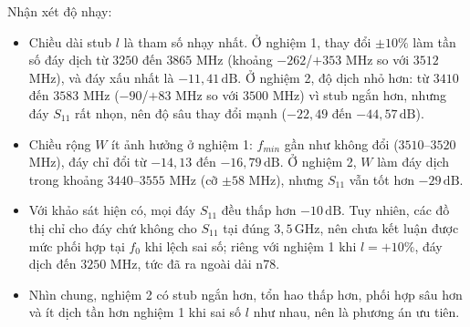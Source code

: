 \documentclass[a4paper]{report}
\newcommand\dB{\,\mathrm{dB}}
\newcommand\GHz{\,\mathrm{GHz}}
\begin{document}
\begin{table}[H]
\caption{Đáy $S_{11}$ và tần số đáy khi quét tham số Single-Stub}\label{tab:stubtolres}
\centering\footnotesize\setlength\tabcolsep{3pt}
\end{table}

Nhận xét độ nhạy:
\begin{itemize}
  \item Chiều dài stub $l$ là tham số nhạy nhất. Ở nghiệm 1, thay đổi $\pm10\%$ làm tần số đáy dịch từ $3250$ đến $3865$ MHz (khoảng $-262$/$+353$ MHz so với $3512$ MHz), và đáy xấu nhất là $-11{,}41\dB$. Ở nghiệm 2, độ dịch nhỏ hơn: từ $3410$ đến $3583$ MHz ($-90$/$+83$ MHz so với $3500$ MHz) vì stub ngắn hơn, nhưng đáy $S_{11}$ rất nhọn, nên độ sâu thay đổi mạnh ($-22{,}49$ đến $-44{,}57\dB$).
  \item Chiều rộng $W$ ít ảnh hưởng ở nghiệm 1: $f_{min}$ gần như không đổi ($3510$--$3520$ MHz), đáy chỉ đổi từ $-14{,}13$ đến $-16{,}79\dB$. Ở nghiệm 2, $W$ làm đáy dịch trong khoảng $3440$--$3555$ MHz (cỡ $\pm58$ MHz), nhưng $S_{11}$ vẫn tốt hơn $-29\dB$.
  \item Với khảo sát hiện có, mọi đáy $S_{11}$ đều thấp hơn $-10\dB$. Tuy nhiên, các đồ thị chỉ cho đáy chứ không cho $S_{11}$ tại đúng $3{,}5\GHz$, nên chưa kết luận được mức phối hợp tại $f_0$ khi lệch sai số; riêng với nghiệm 1 khi $l=+10\%$, đáy dịch đến $3250$ MHz, tức đã ra ngoài dải n78.
  \item Nhìn chung, nghiệm 2 có stub ngắn hơn, tổn hao thấp hơn, phối hợp sâu hơn và ít dịch tần hơn nghiệm 1 khi sai số $l$ như nhau, nên là phương án ưu tiên.
\end{itemize}
\end{document}
